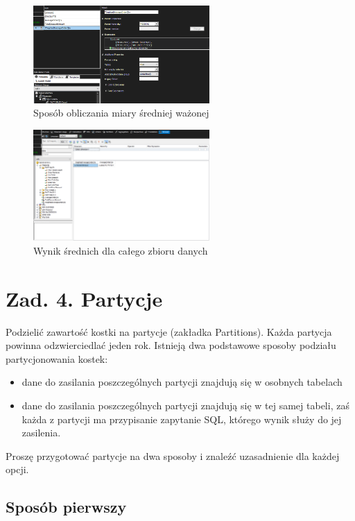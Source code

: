 \documentclass[a4paper,12pt]{article}
\begin{document}
\begin{figure}[H]
  \includegraphics[width=0.6\textwidth]{images/3_calculations_2.png}
  \caption{Sposób obliczania miary średniej ważonej}
\end{figure}

\begin{figure}[H]
  \includegraphics[width=0.6\textwidth]{images/3_result.png}
  \caption{Wynik średnich dla całego zbioru danych}
\end{figure}

\section{Zad. 4. Partycje}

Podzielić zawartość kostki na partycje (zakładka Partitions). Każda partycja powinna
odzwierciedlać jeden rok. Istnieją dwa podstawowe sposoby podziału partycjonowania kostek:
\begin{itemize}
  \item dane do zasilania poszczególnych partycji znajdują się w osobnych tabelach
  \item dane do zasilania poszczególnych partycji znajdują się w tej samej tabeli, zaś każda z partycji ma przypisanie zapytanie SQL, którego wynik służy do jej zasilenia.
\end{itemize}
Proszę przygotować partycje na dwa sposoby i znaleźć uzasadnienie dla każdej opcji.

\subsection{Sposób pierwszy}
\end{document}
